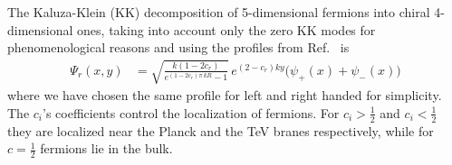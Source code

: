 \documentclass[twocolumn,showpacs,showkeys,prd,superscriptaddress]{revtex4-1}
\begin{document}
The Kaluza-Klein (KK) decomposition of 5-dimensional fermions into chiral 4-dimensional ones, taking into account only the zero KK modes for phenomenological reasons and using the profiles from Ref.~\cite{Gherghetta:2000qt} is
\begin{align}
  \Psi_r(x,y) &= \sqrt{\frac{k\left(1-2c_r\right)}{e^{(1-2c_r)\pi\,kR}-1}}\,e^{(2-c_r)ky}\bigg(\psi_+(x) + \psi_-(x)\bigg)
\end{align}
where we have chosen the same profile for left and right handed for simplicity. The $c_i$'s coefficients control the localization of fermions. %
For $c_i>\tfrac{1}{2}$ and $c_i<\tfrac{1}{2}$
they are localized near the Planck and the TeV branes respectively,
while for $c=\tfrac{1}{2}$ fermions lie in the bulk.




\end{document}
